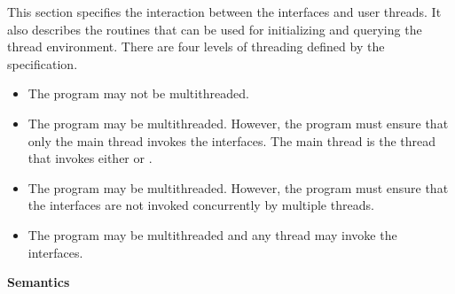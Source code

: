 This section specifies the interaction between the \openshmem interfaces and
user threads.  It also describes the routines that can be used for initializing and
querying the thread environment. There are four levels of threading defined by
the \openshmem specification.

\begin{itemize}
\item {\bf {}} The \openshmem program may not be multithreaded.

\item {\bf {}}
The \openshmem program may be multithreaded. However, the program must ensure
that only the main thread invokes the \openshmem interfaces. The main thread
is the thread that invokes either  or .

\item {\bf {}}
The \openshmem program may be multithreaded. However, the program must ensure
that the \openshmem interfaces are not invoked concurrently by multiple threads.

\item {\bf {}}
The \openshmem program may be multithreaded and any thread may invoke the \openshmem
interfaces.
\end{itemize}

\hspace{-15pt}
{\bf Semantics}


